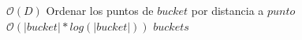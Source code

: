 \begin{algorithm}[H]
\caption{\Comment $\mathcal{O}(n * log(n))$}
\begin{algorithmic}[1]
	 \Comment $\mathcal{O}(D)$
		\State Ordenar los puntos de $bucket$ por distancia a $punto$ \Comment $\mathcal{O}(|bucket| * log(|bucket|))$
	\EndFor
	\Statex
	\State \Return $buckets$
\EndFunction
\end{algorithmic}
\end{algorithm}